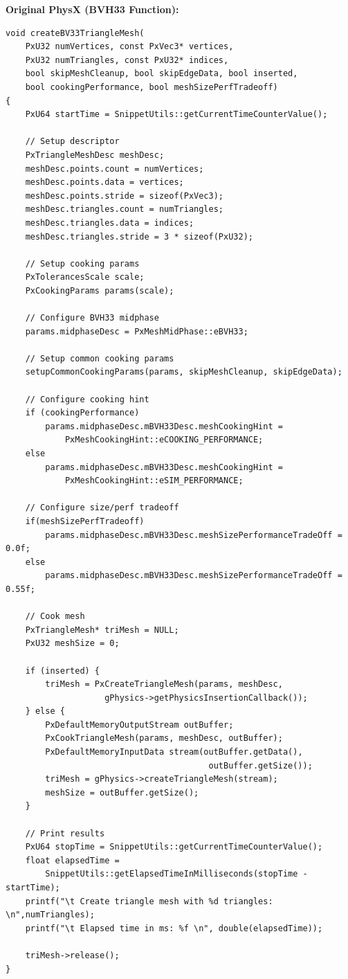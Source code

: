 \textbf{Original PhysX (BVH33 Function):}
\begin{lstlisting}[caption={Original: Separate BVH33 cooking function}]
void createBV33TriangleMesh(
    PxU32 numVertices, const PxVec3* vertices,
    PxU32 numTriangles, const PxU32* indices,
    bool skipMeshCleanup, bool skipEdgeData, bool inserted,
    bool cookingPerformance, bool meshSizePerfTradeoff)
{
    PxU64 startTime = SnippetUtils::getCurrentTimeCounterValue();

    // Setup descriptor
    PxTriangleMeshDesc meshDesc;
    meshDesc.points.count = numVertices;
    meshDesc.points.data = vertices;
    meshDesc.points.stride = sizeof(PxVec3);
    meshDesc.triangles.count = numTriangles;
    meshDesc.triangles.data = indices;
    meshDesc.triangles.stride = 3 * sizeof(PxU32);

    // Setup cooking params
    PxTolerancesScale scale;
    PxCookingParams params(scale);

    // Configure BVH33 midphase
    params.midphaseDesc = PxMeshMidPhase::eBVH33;

    // Setup common cooking params
    setupCommonCookingParams(params, skipMeshCleanup, skipEdgeData);

    // Configure cooking hint
    if (cookingPerformance)
        params.midphaseDesc.mBVH33Desc.meshCookingHint =
            PxMeshCookingHint::eCOOKING_PERFORMANCE;
    else
        params.midphaseDesc.mBVH33Desc.meshCookingHint =
            PxMeshCookingHint::eSIM_PERFORMANCE;

    // Configure size/perf tradeoff
    if(meshSizePerfTradeoff)
        params.midphaseDesc.mBVH33Desc.meshSizePerformanceTradeOff = 0.0f;
    else
        params.midphaseDesc.mBVH33Desc.meshSizePerformanceTradeOff = 0.55f;

    // Cook mesh
    PxTriangleMesh* triMesh = NULL;
    PxU32 meshSize = 0;

    if (inserted) {
        triMesh = PxCreateTriangleMesh(params, meshDesc,
                    gPhysics->getPhysicsInsertionCallback());
    } else {
        PxDefaultMemoryOutputStream outBuffer;
        PxCookTriangleMesh(params, meshDesc, outBuffer);
        PxDefaultMemoryInputData stream(outBuffer.getData(),
                                         outBuffer.getSize());
        triMesh = gPhysics->createTriangleMesh(stream);
        meshSize = outBuffer.getSize();
    }

    // Print results
    PxU64 stopTime = SnippetUtils::getCurrentTimeCounterValue();
    float elapsedTime =
        SnippetUtils::getElapsedTimeInMilliseconds(stopTime - startTime);
    printf("\t Create triangle mesh with %d triangles: \n",numTriangles);
    printf("\t Elapsed time in ms: %f \n", double(elapsedTime));

    triMesh->release();
}
\end{lstlisting}

